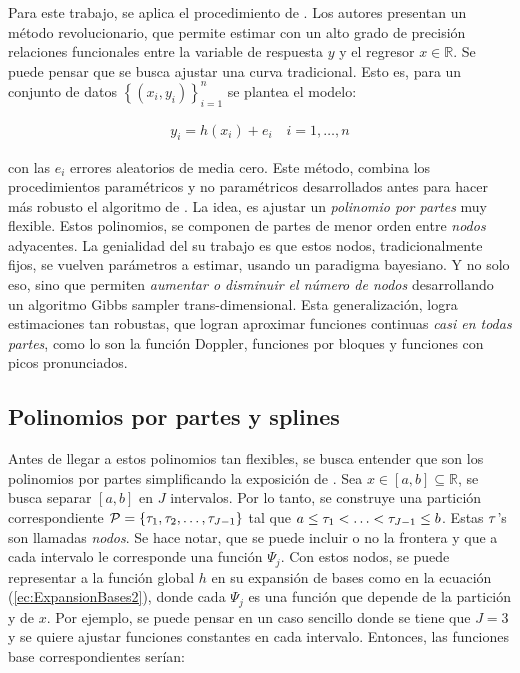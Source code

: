 \documentclass[../Main/Main.tex]{subfiles}
\begin{document}
Para este trabajo, se aplica el procedimiento de   \autocite{mallik1998automatic}. Los autores presentan un método revolucionario, que permite estimar con un alto grado de precisión relaciones funcionales entre la variable de respuesta $y$ y el regresor $x\in\mathbb{R}$. Se puede pensar que se busca ajustar una curva tradicional. Esto es, para un conjunto de datos $\left\{(x_i,y_i) \right\}_{i = 1}^n$ se plantea el modelo:

\begin{align}
	y_i = h(x_i) + e_i \quad i = 1,\ldots,n \label{ec:EstCurvas}
\end{align}

con las $e_i$ errores aleatorios de media cero. Este método, combina   los procedimientos paramétricos y no paramétricos desarrollados antes para hacer más robusto el algoritmo de \autocite{hastie1986generalized}. La idea, es ajustar un \textit{polinomio por partes} muy flexible. Estos polinomios, se componen de partes de menor orden entre \textit{nodos} adyacentes. La genialidad del su trabajo es que estos nodos, tradicionalmente fijos, se vuelven parámetros a estimar, usando un paradigma bayesiano. Y no solo eso, sino que permiten \textit{aumentar o disminuir el número de nodos} desarrollando un algoritmo Gibbs sampler trans-dimensional. Esta generalización, logra estimaciones tan robustas, que logran aproximar funciones continuas \textit{casi en todas partes}, como lo son la función Doppler, funciones por bloques y funciones con picos pronunciados. \\ 

\subsection{Polinomios por partes y splines} \label{sec:PolisYSplines}

Antes de llegar a estos polinomios tan flexibles, se busca entender que son los polinomios por partes simplificando la exposición de \autocite{wahba1990splines}. Sea $x\in[a,b]\subseteq\mathbb{R}$, se busca separar $[a,b]$ en $J$ intervalos. Por lo tanto, se construye una partición correspondiente $\mathcal{P} = \left\{\tau_1,  \tau_2,\ldots,  \tau_{J-1} \right\}$ tal que $a \leq  \tau_1 < \ldots <  \tau_{J-1} \leq b$. Estas $ \tau$'s son llamadas \textit{nodos}. Se hace notar, que se puede incluir o no la frontera y que a cada intervalo le corresponde una función $\Psi_j$. Con estos nodos, se puede representar a la función global $h$ en su expansión de bases como en la ecuación (\ref{ec:ExpansionBases2}), donde cada $\Psi_j$ es una función que depende de la partición y de $x$. Por ejemplo, se puede pensar en un caso sencillo donde se tiene que $J = 3$ y se quiere ajustar funciones constantes en cada intervalo. Entonces, las funciones base correspondientes serían:
\end{document}
